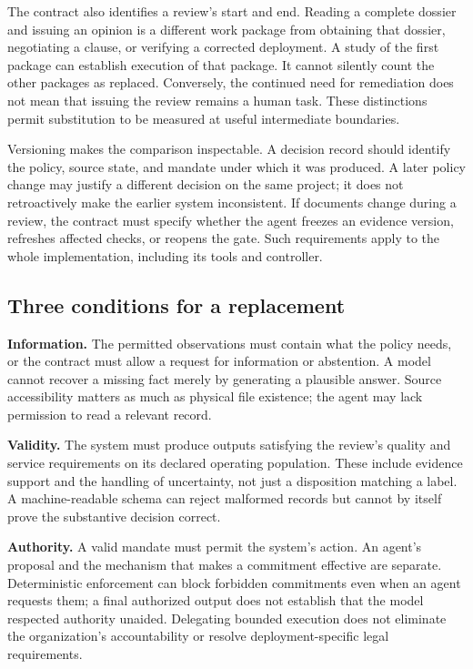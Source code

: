 The contract also identifies a review's start and end. Reading a complete dossier and issuing
an opinion is a different work package from obtaining that dossier, negotiating a clause, or
verifying a corrected deployment. A study of the first package can establish execution of that
package. It cannot silently count the other packages as replaced. Conversely, the continued
need for remediation does not mean that issuing the review remains a human task. These
distinctions permit substitution to be measured at useful intermediate boundaries.

Versioning makes the comparison inspectable. A decision record should identify the policy,
source state, and mandate under which it was produced. A later policy change may justify a
different decision on the same project; it does not retroactively make the earlier system
inconsistent. If documents change during a review, the contract must specify whether the
agent freezes an evidence version, refreshes affected checks, or reopens the gate. Such
requirements apply to the whole implementation, including its tools and controller.

\subsection{Three conditions for a replacement}

\textbf{Information.} The permitted observations must contain what the policy needs, or the
contract must allow a request for information or abstention. A model cannot recover a missing
fact merely by generating a plausible answer. Source accessibility matters as much as physical
file existence; the agent may lack permission to read a relevant record.

\textbf{Validity.} The system must produce outputs satisfying the review's quality and service
requirements on its declared operating population. These include evidence support and the
handling of uncertainty, not just a disposition matching a label. A machine-readable schema
can reject malformed records but cannot by itself prove the substantive decision correct.

\textbf{Authority.} A valid mandate must permit the system's action. An agent's proposal and
the mechanism that makes a commitment effective are separate. Deterministic enforcement can
block forbidden commitments even when an agent requests them; a final authorized output does
not establish that the model respected authority unaided. Delegating bounded execution does
not eliminate the organization's accountability or resolve deployment-specific legal requirements.

